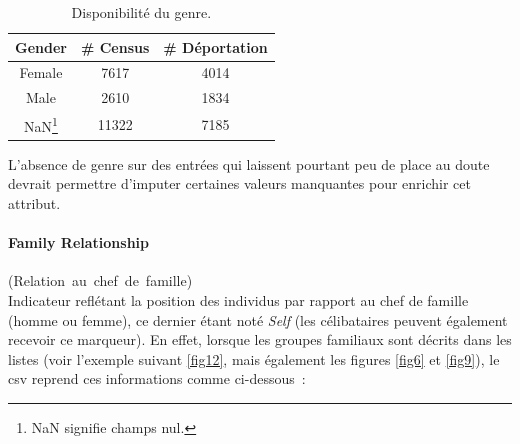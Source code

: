 \documentclass[a4paper,12pt,twoside]{book}
\begin{document}
                    \begin{savenotes} %
                    \begin{table}[ht]
                    \centering
                    \renewcommand\cellalign{cl}
                        \begin{tabular}{|c|c|c|}
                            \hline
                            Gender & \# Census & \# Déportation\\
                            \hline
                            Female &   7617 & 4014 \\
                            Male &   2610 & 1834 \\
                            NaN\footnote{\og{}NaN\fg{} signifie champs nul.} & 11322 & 7185 \\
                            \hline
                        \end{tabular}
                    \caption{Disponibilité du genre.}\label{tab4}
                    \end{table}
                    \end{savenotes}
                    
                L'absence de genre sur des entrées qui laissent pourtant peu de place au doute devrait permettre d'imputer certaines valeurs manquantes pour enrichir cet attribut.

                \paragraph{Family Relationship}\mbox{(Relation au chef de famille)} \\
                
                Indicateur reflétant la position des individus par rapport au chef de famille (homme ou femme), ce dernier étant noté \og{}\textit{Self}\fg{} (les célibataires peuvent également recevoir ce marqueur).
                En effet, lorsque les groupes familiaux sont décrits dans les listes (voir l'exemple suivant \ref{fig12}, mais également les figures \ref{fig6} et \ref{fig9}), le \acrshort{csv} reprend ces informations comme ci-dessous~:
                
                \pagebreak
                
\end{document}
